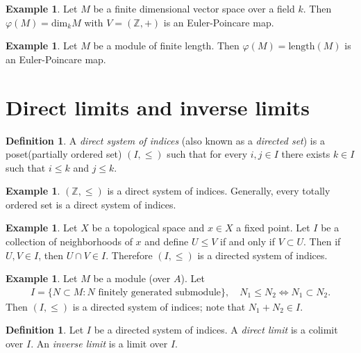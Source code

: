 \documentclass[12pt]{report}
\theoremstyle{plain}
\theoremstyle{remark}
\theoremstyle{definition}
\newtheorem{definition}[theorem]{Definition}
\newtheorem{example}[theorem]{Example}
\newcommand{\Z}{\mathbb{Z}}
\begin{document}
\begin{example}
    Let $M$ be a finite dimensional vector space over a field $k$. Then $\varphi(M)=\mathrm{dim}_k M$ with $V=(\Z,+)$ is an Euler-Poincare map.
\end{example}

\begin{example}
    Let $M$ be a module of finite length. Then $\varphi(M)=\mathrm{length}(M)$ is an Euler-Poincare map.
\end{example}


\clearpage
\section{Direct limits and inverse limits}

\begin{definition}
    A \emph{direct system of indices} (also known as a \emph{directed set}) is a poset(partially ordered set) $(I,\le)$ such that for every $i,j\in I$ there exists $k\in I$ such that $i\le k$ and $j\le k$.
\end{definition}

\begin{example}
    $(\Z,\le)$ is a direct system of indices. Generally, every totally ordered set is a direct system of indices.
\end{example}

\begin{example}
    Let $X$ be a topological space and $x\in X$ a fixed point. Let $I$ be a collection of neighborhoods of $x$ and define $U\le V$ if and only if $V\subset U$. Then if $U,V\in I$, then $U\cap V\in I$. Therefore $(I,\le)$ is a directed system of indices.
\end{example}

\begin{example}
    Let $M$ be a module (over $A$). Let
    \begin{align*}
        I=\{N\subset M:N\text{ finitely generated submodule}\},\quad N_1\le N_2\iff N_1\subset N_2.
    \end{align*}
    Then $(I,\le)$ is a directed system of indices; note that $N_1+N_2\in I$.
\end{example}

\begin{definition}
    Let $I$ be a directed system of indices. A \emph{direct limit} is a colimit over $I$. An \emph{inverse limit} is a limit over $I$.
\end{definition}
\end{document}
